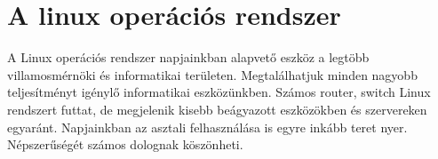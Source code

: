 
\chapter{A linux operációs rendszer}

A Linux operációs rendszer napjainkban alapvető eszköz a legtöbb villamosmérnöki és informatikai területen. Megtalálhatjuk minden nagyobb teljesítményt igénylő informatikai eszközünkben. Számos router, switch Linux rendszert futtat,
de megjelenik kisebb beágyazott eszközökben és szervereken egyaránt. Napjainkban az asztali felhasználása is egyre inkább teret nyer. Népszerűségét számos dolognak köszönheti. 
